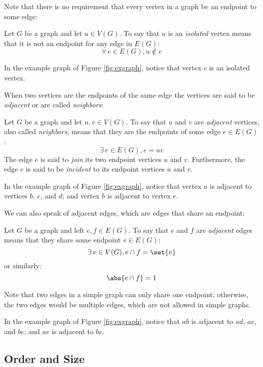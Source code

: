 Note that there is no requirement that every vertex in a graph be an endpoint to some edge:

\begin{definition}
  Let \(G\) be a graph and let \(u\in V(G)\).  To say that \(u\) is an \emph{isolated} vertex means that it is not
  an endpoint for any edge in \(E(G)\):
  \[\forall\,e\in E(G),u\notin e\]
\end{definition}

In the example graph of Figure \ref{fig:exgraph}, notice that vertex \(c\) is an isolated vertex.

When two vertices are the endpoints of the same edge the vertices are said to be \emph{adjacent} or are called
\emph{neighbors}:

\begin{definition}
  Let \(G\) be a graph and let \(u,v\in V(G)\).  To say that \(u\) and \(v\) are \emph{adjacent} vertices, also
  called \emph{neighbors}, means that they are the endpoints of some edge \(e\in E(G)\):
  \[\exists\,e\in E(G),e=uv\]
  The edge \(e\) is said to \emph{join} its two endpoint vertices \(u\) and \(v\).  Furthermore, the edge \(e\) is
  said to be \emph{incident} to its endpoint vertices \(u\) and \(v\).
\end{definition}

In the example graph of Figure \ref{fig:exgraph}, notice that vertex \(a\) is adjacent to vertices \(b\), \(e\),
and \(d\); and vertex \(b\) is adjacent to vertex \(e\).

We can also speak of adjacent edges, which are edges that share an endpoint:

\begin{definition}
  Let \(G\) be a graph and left \(e,f\in E(G)\).  To say that \(e\) and \(f\) are \emph{adjacent} edges means that
  they share some endpoint \(v\in E(G)\):
  \[\exists\,v\in V(G),e\cap f=\set{v}\]
  or similarly:
  \[\abs{e\cap f}=1\]
\end{definition}

Note that two edges in a simple graph can only share one endpoint; otherwise, the two edges would be multiple edges,
which are not allowed in simple graphs.

In the example graph of Figure \ref{fig:exgraph}, notice that \(ab\) is adjacent to \(ad\), \(ae\), and \(be\); and
\(ae\) is adjacent to \(be\).

\subsection{Order and Size}

